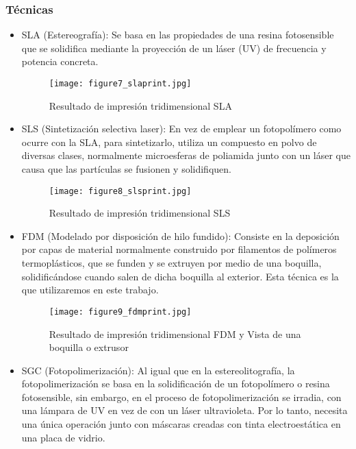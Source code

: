 			\subsubsection{Técnicas}
				\begin{itemize}
					\item SLA (Estereografía): Se basa en las propiedades de una resina fotosensible que se solidifica mediante la proyección de un láser (UV) de frecuencia y potencia concreta.
					
					\begin{figure}[h]
						\centering
						\texttt{[image: figure7\_slaprint.jpg]}
						\caption{Resultado de impresión tridimensional SLA}
					\end{figure}
					
					\item SLS (Sintetización selectiva laser): En vez de emplear un fotopolímero como ocurre con la SLA, para sintetizarlo, utiliza un compuesto en polvo de diversas clases, normalmente microesferas de poliamida junto con un láser que causa que las partículas se fusionen y solidifiquen. 
					
					\newpage
					\thispagestyle{plain}
					
					\begin{figure}[h]
						\centering
						\texttt{[image: figure8\_slsprint.jpg]}
						\caption{Resultado de impresión tridimensional SLS}
					\end{figure}
					
					\item FDM (Modelado por disposición de hilo fundido): Consiste en la deposición por capas de material normalmente construido por filamentos de polímeros termoplásticos, que se funden y se extruyen por medio de una boquilla, solidificándose cuando salen de dicha boquilla al exterior. Esta técnica es la que utilizaremos en este trabajo.
					
					\begin{figure}[h]
						\centering
						\texttt{[image: figure9\_fdmprint.jpg]}
						\caption{Resultado de impresión tridimensional FDM y Vista de una boquilla o extrusor}
					\end{figure}
					
					\item SGC (Fotopolimerización): Al igual que en la estereolitografía, la fotopolimerización se basa en la solidificación de
					un fotopolímero o resina fotosensible, sin embargo, en el proceso de
					fotopolimerización se irradia, con una lámpara de UV en vez de con un láser
					ultravioleta. Por lo tanto, necesita una única operación junto con máscaras creadas
					con tinta electroestática en una placa de vidrio.
					

\end{itemize}
